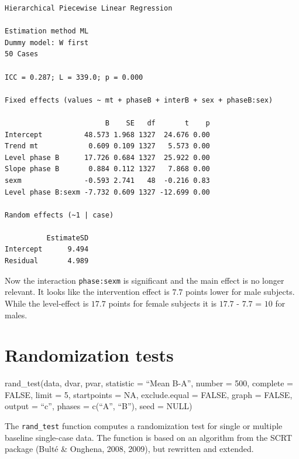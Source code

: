 \documentclass[
  letterpaper,
  DIV=11,
  numbers=noendperiod]{scrreprt}
\begin{document}
\begin{verbatim}
Hierarchical Piecewise Linear Regression

Estimation method ML 
Dummy model: W first
50 Cases

ICC = 0.287; L = 339.0; p = 0.000

Fixed effects (values ~ mt + phaseB + interB + sex + phaseB:sex)

                        B    SE   df       t    p
Intercept          48.573 1.968 1327  24.676 0.00
Trend mt            0.609 0.109 1327   5.573 0.00
Level phase B      17.726 0.684 1327  25.922 0.00
Slope phase B       0.884 0.112 1327   7.868 0.00
sexm               -0.593 2.741   48  -0.216 0.83
Level phase B:sexm -7.732 0.609 1327 -12.699 0.00

Random effects (~1 | case)

          EstimateSD
Intercept      9.494
Residual       4.989
\end{verbatim}

Now the interaction \texttt{phase:sexm} is significant and the main
effect is no longer relevant. It looks like the intervention effect is
\(7.7\) points lower for male subjects. While the level-effect is
\(17.7\) points for female subjects it is \(17.7\) - \(7.7\) = \(10\)
for males.

\hypertarget{randomization-tests}{%
\chapter{Randomization tests}\label{randomization-tests}}

\begin{tcolorbox}[enhanced jigsaw, toprule=.15mm, colframe=quarto-callout-tip-color-frame, left=2mm, colback=white, breakable, bottomrule=.15mm, arc=.35mm, rightrule=.15mm, leftrule=.75mm, opacityback=0]
\begin{minipage}[t]{5.5mm}
\textcolor{quarto-callout-tip-color}{\faLightbulb}
\end{minipage}%
\begin{minipage}[t]{\textwidth - 5.5mm}
rand\_test(data, dvar, pvar, statistic = ``Mean B-A'', number = 500,
complete = FALSE, limit = 5, startpoints = NA, exclude.equal = FALSE,
graph = FALSE, output = ``c'', phases = c(``A'', ``B''), seed =
NULL)\end{minipage}%
\end{tcolorbox}

The \texttt{rand\_test} function computes a randomization test for
single or multiple baseline single-case data. The function is based on
an algorithm from the SCRT package (Bulté \& Onghena, 2008, 2009), but
rewritten and extended.
\end{document}
